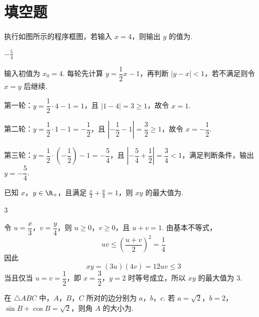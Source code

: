 \section{填空题}

\begin{problem}
执行如图所示的程序框图，若输入 \(x = 4\)，则输出 \(y\) 的值为\fillinblank{}.

\end{problem}

\begin{answer}
\(-\frac{5}{4}\)
\end{answer}

\begin{solution}
输入初值为 \(x_0=4\). 每轮先计算 \(y=\dfrac12x-1\)，再判断 \(|y-x|<1\)，若不满足则令 \(x=y\) 后继续.

第一轮：\(y=\dfrac12\cdot4-1=1\)，且 \(|1-4|=3\geqslant1\)，故令 \(x=1\).

第二轮：\(y=\dfrac12\cdot1-1=-\dfrac12\)，且 \(\left|-\dfrac12-1\right|=\dfrac32\geqslant1\)，故令 \(x=-\dfrac12\).

第三轮：\(y=\dfrac12\cdot\left(-\dfrac12\right)-1=-\dfrac54\)，且 \(\left|-\dfrac54+\dfrac12\right|=\dfrac34<1\)，满足判断条件，输出 \(y=-\dfrac54\).
\end{solution}

\begin{problem}
已知 \(x\)，\(y \in \R_+\)，且满足 \(\frac{x}{3} + \frac{y}{4} = 1\)，则 \(xy\) 的最大值为\fillinblank{}.
\end{problem}

\begin{answer}
\(3\)
\end{answer}

\begin{solution}
令 \(u=\dfrac{x}{3}\)，\(v=\dfrac{y}{4}\)，则 \(u\geqslant0\)，\(v\geqslant0\)，且 \(u+v=1\). 由基本不等式，
\[
uv\leqslant\left(\frac{u+v}{2}\right)^2=\frac14
\]
因此
\[
xy=(3u)(4v)=12uv\leqslant3
\]
当且仅当 \(u=v=\dfrac12\)，即 \(x=\dfrac32\)，\(y=2\) 时等号成立，所以 \(xy\) 的最大值为 \(3\).
\end{solution}

\begin{problem}
在 \(\triangle ABC\) 中，\(A\)，\(B\)，\(C\) 所对的边分别为 \(a\)，\(b\)，\(c\). 若 \(a = \sqrt{2}\)，\(b = 2\)，\(\sin B + \cos B = \sqrt{2}\)，则角 \(A\) 的大小为\fillinblank{}.
\end{problem}

